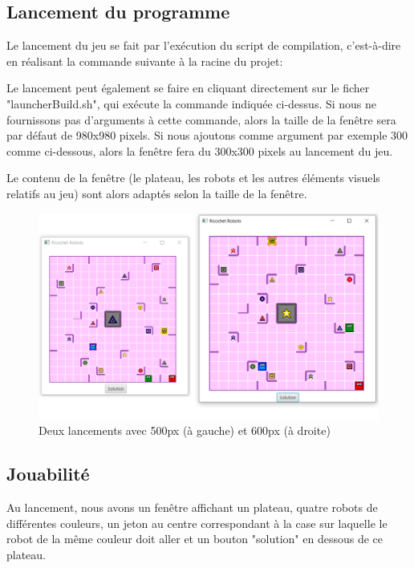 \documentclass[a4paper, 12pt]{article}
\begin{document}
    \subsection{Lancement du programme}
        Le lancement du jeu se fait par l'exécution du script de compilation, c'est-à-dire en réalisant la commande suivante à la racine du projet:
        
        Le lancement peut également se faire en cliquant directement sur le ficher "launcherBuild.sh", qui exécute la commande indiquée ci-dessus.
        Si nous ne fournissons pas d'arguments à cette commande, alors la taille de la fenêtre sera par défaut de 980x980 pixels. Si nous ajoutons comme argument par exemple 300 comme ci-dessous, alors la fenêtre fera du 300x300 pixels au lancement du jeu.
        
        
        Le contenu de la fenêtre (le plateau, les robots et les autres éléments visuels relatifs au jeu) sont alors adaptés selon la taille de la fenêtre.
        
        \begin{figure}[H]
            \centering
            \includegraphics[scale=0.5]{images/dimensionDifferente.PNG}
            \caption{Deux lancements avec 500px (à gauche) et 600px (à droite)}
        \end{figure}
        
    \subsection{Jouabilité}
        Au lancement, nous avons un fenêtre affichant un plateau, quatre robots de différentes couleurs, un jeton au centre correspondant à la case sur laquelle le robot de la même couleur doit aller et un bouton "solution" en dessous de ce plateau. 
        
\end{document}
